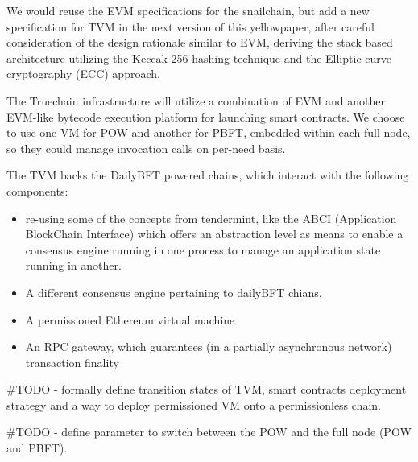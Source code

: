 We would reuse the EVM specifications for the snailchain, but add a new specification for TVM in the next version of this yellowpaper,
after careful consideration of the design rationale similar to EVM, deriving the stack based architecture utilizing the Keccak-256
hashing technique and the Elliptic-curve cryptography (ECC) approach.

The Truechain infrastructure will utilize a combination of EVM and another EVM-like bytecode execution platform for launching smart contracts.
We choose to use one VM for POW and another for PBFT, embedded within each full node, so they could manage invocation calls on per-need basis.

The TVM backs the DailyBFT powered chains, which interact with the following components:
\begin{itemize}
  \item re-using some of the concepts from tendermint, like the ABCI (Application BlockChain Interface) which offers
  an abstraction level as means to enable a consensus engine running in one process to manage an application state running in another.
  \item A different consensus engine pertaining to dailyBFT chians,
  \item A permissioned Ethereum virtual machine
  \item An RPC gateway, which guarantees (in a partially asynchronous network) transaction finality
\end{itemize}

\#TODO - formally define transition states of TVM, smart contracts deployment strategy
and a way to deploy permissioned VM onto a permissionless chain.

\#TODO - define parameter to switch between the POW and the full node (POW and PBFT).
